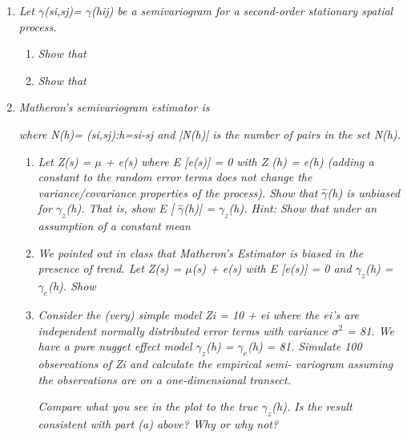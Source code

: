 \documentclass{article}\usepackage[]{graphicx}\usepackage[]{color}
\begin{document}
\begin{enumerate}
\item %
{\it Let $\gamma$(si,sj)= $\gamma$(hij) be a semivariogram for a second-order stationary spatial process.}
\begin{enumerate} 
\item %
{\it Show that}


\vspace{3in}

\item %
{\it Show that}

\vspace{3in}
\end{enumerate}

\item %
{\it Matheron’s semivariogram estimator is}

\vspace{1in}

{\it where N(h)= {(si,sj):h=si-sj} and |N(h)| is the number of pairs in the set N(h).}

\begin{enumerate}
\item %
{\it Let Z(s) = $\mu$ + e(s) where E [e(s)] = 0 with  Z (h) =  e(h) (adding a constant to the random error terms does not change the variance/covariance properties of the process). Show that $\hat{\gamma}$(h) is unbiased for $\gamma_{z}$(h). That is, show E [ $\hat{\gamma}$(h)] =  $\gamma_{z}$(h). Hint: Show that under an assumption of a constant mean}

\vspace{4in}

\item {\it We pointed out in class that Matheron’s Estimator is biased in the presence of trend. Let Z(s) = $\mu$(s) + e(s) with E [e(s)] = 0 and  $\gamma_{z}$(h) =  $\gamma_{e}$(h). Show}

\vspace{4in}

\item %
{\it Consider the (very) simple model Zi = 10 + ei where the ei’s are independent normally distributed error terms with variance  $\sigma^{2}$ = 81. We have a pure nugget effect model  $\gamma_{z}$(h) =  $\gamma_{e}$(h) = 81. Simulate 100 observations of Zi and calculate the empirical semi- variogram assuming the observations are on a one-dimensional transect.}

{\it Compare what you see in the plot to the true  $\gamma_{z}$(h). Is the result consistent with part (a) above? Why or why not?}


\end{enumerate}
\end{enumerate}
\end{document}
